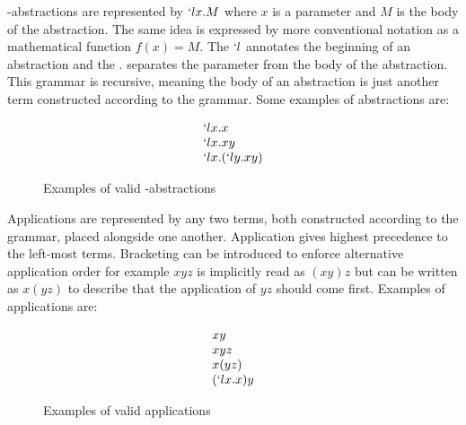   \begin{figure}[!h]
  \end{figure}

  \lam-abstractions are represented by $`lx.M$ where $x$ is a parameter and $M$ is the body of the abstraction. 
  The same idea is expressed by more conventional notation as a mathematical function $f(x) = M$. 
  The $`l$ annotates the beginning of an abstraction and the $.$ separates the parameter from the body of the abstraction.
  This grammar is recursive, meaning the body of an abstraction is just another term constructed according to the grammar. 
  Some examples of abstractions are:
  
  \begin{figure}[!h]
    \[
      \begin{array}{l}
      `lx.x \\
      `lx.xy \\
      `lx.(`ly.xy)
      \end{array}
    \]
  \caption{Examples of valid \lam-abstractions}
  \end{figure}
  
  Applications are represented by any two terms, 
    both constructed according to the grammar, 
  placed alongside one another. 
  Application gives highest precedence to the left-most terms. 
  Bracketing can be introduced to enforce 
  alternative application order for example $xyz$ is implicitly read as 
    $(xy)z$ 
  but can be written as 
    $x(yz)$ 
  to describe that the application of $yz$ should come first. 
  Examples of applications are:
    \begin{figure}[!h]
      \[
        \begin{array}{l}
        xy \\
        xyz \\
        x(yz) \\
        (`lx.x)y
        \end{array}
      \]
    \caption{Examples of valid applications}
    \end{figure}

